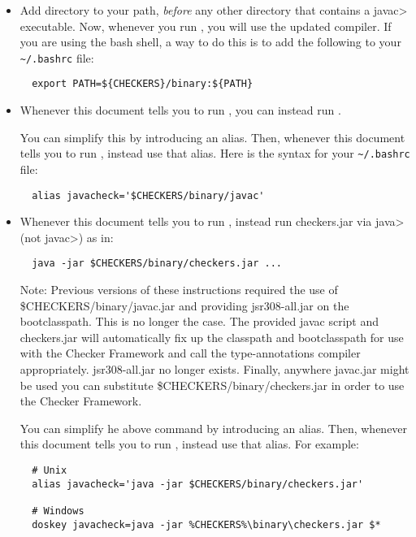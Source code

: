 \begin{enumerate}
  \begin{itemize}
  \item
    Add directory
     to your path, \emph{before} any other
    directory that contains a \<javac> executable.  Now, whenever
    you run , you will use the updated compiler.  If you are
    using the bash shell, a way to do this is to add the following to your
    \verb|~/.bashrc| file:
\begin{Verbatim}
  export PATH=${CHECKERS}/binary:${PATH}
\end{Verbatim}
  \item
    Whenever this document tells you to run , you
    can instead run .

    You can simplify this by introducing an alias.  Then,
    whenever this document tells you to run , instead use that
    alias.  Here is the syntax for your 
    \verb|~/.bashrc| file:
\begin{Verbatim}
  alias javacheck='$CHECKERS/binary/javac'
\end{Verbatim}

 \item
   Whenever this document tells you to run , instead
   run checkers.jar via \<java> (not \<javac>) as in:

\begin{Verbatim}
  java -jar $CHECKERS/binary/checkers.jar ...
\end{Verbatim}

    Note: Previous versions of these instructions required the use of
    \$CHECKERS/binary/javac.jar and providing jsr308-all.jar on the bootclasspath.
    This is no longer the case.  The provided javac script and checkers.jar
    will automatically fix up the classpath and bootclasspath for use with
    the Checker Framework and call the type-annotations compiler appropriately.
    jsr308-all.jar no longer exists.  Finally, anywhere javac.jar might be used
    you can substitute \$CHECKERS/binary/checkers.jar in order to use
    the Checker Framework.

    You can simplify he above command by introducing an alias.  Then,
    whenever this document tells you to run , instead use that
    alias.  For example:

\begin{Verbatim}
  # Unix
  alias javacheck='java -jar $CHECKERS/binary/checkers.jar'

  # Windows
  doskey javacheck=java -jar %CHECKERS%\binary\checkers.jar $*
\end{Verbatim}
\end{itemize}

\end{enumerate}


